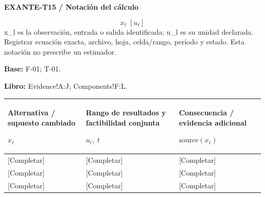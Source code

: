 \par\begingroup\sffamily\fontsize{8}{10}\selectfont\color{NEBGreen}\setlength{\parskip}{2pt}\setlength{\abovedisplayskip}{4pt}\setlength{\belowdisplayskip}{4pt}\setlength{\abovedisplayshortskip}{2pt}\setlength{\belowdisplayshortskip}{3pt}
\textbf{EXANTE-T15 / Notación del cálculo}\par
{\fontsize{9}{11}\selectfont\[ x_{\ell}\;[u_{\ell}] \]}
x\_l es la observación, entrada o salida identificada; u\_l es su unidad declarada. Registrar ecuación exacta, archivo, hoja, celda/rango, período y estado. Esta notación no prescribe un estimador.\par
\textbf{Base:} F-01; T-01.\par
\textbf{Libro:} Evidence!A:J; Components!F:L.\par\endgroup
{\sffamily\fontsize{8.3}{10.3}\selectfont\begin{longtable}{@{}P{54.83mm} P{54.83mm} P{54.83mm}@{}}
\toprule
\textbf{Alternativa / supuesto cambiado}\par {\normalfont\fontsize{8.2}{10}\selectfont $x_{\ell}$} & \textbf{Rango de resultados y factibilidad conjunta}\par {\normalfont\fontsize{8.2}{10}\selectfont $u_{\ell},\ t$} & \textbf{Consecuencia / evidencia adicional}\par {\normalfont\fontsize{8.2}{10}\selectfont $\text{source}(x_{\ell})$}\\\midrule\endhead
\rule{0pt}{8mm}[Completar] & [Completar] & [Completar]\\\hline
\rule{0pt}{8mm}[Completar] & [Completar] & [Completar]\\\hline
\rule{0pt}{8mm}[Completar] & [Completar] & [Completar]\\\hline
\end{longtable}}
\par\begingroup\sffamily\fontsize{8}{10}\selectfont\color{NEBGreen}\setlength{\parskip}{2pt}\setlength{\abovedisplayskip}{4pt}\setlength{\belowdisplayskip}{4pt}\setlength{\abovedisplayshortskip}{2pt}\setlength{\belowdisplayshortskip}{3pt}

